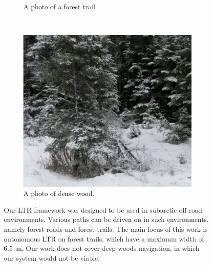 \begin{figure} [h]
\begin{center}
\begin{subfigure} [b] {0.32\textwidth}
		\caption{A photo of a forest trail.}
		\label{fig:narrow_path}
	\end{subfigure}
	~~
	\begin{subfigure} [b] {0.32\textwidth}
		\includegraphics[width=\linewidth]{figs/intro/woods_inkscape.pdf}
		\caption{A photo of dense wood.}
		\label{fig:wood}
	\end{subfigure}
	\end{center}
	\caption{Our \ac{LTR} framework was designed to be used in subarctic off-road environments.
	Various paths can be driven on in such environments, namely forest roads and forest trails. 
	The main focus of this work is autonomous \ac{LTR} on forest trails, which have a maximum width of \SI{6.5}{m}.
	Our work does not cover deep woods navigation, in which our system would not be viable.}
	\label{fig:intro}
\end{figure}

\lightlipsum[1]
\lightlipsum[1]
\lightlipsum[1]

